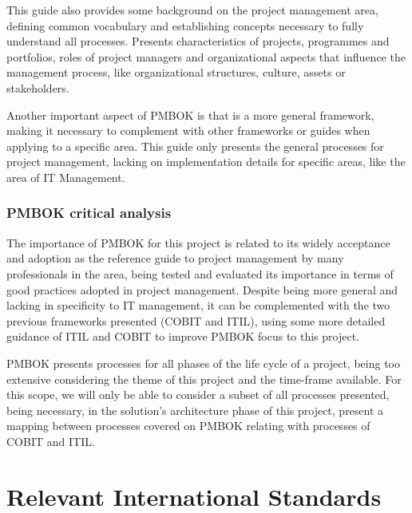 This guide also provides some background on the project management area, defining common vocabulary and establishing concepts necessary to fully understand all processes. Presents characteristics of projects, programmes and portfolios, roles of project managers and organizational aspects that influence the management process, like organizational structures, culture, assets or stakeholders.\par 
Another important aspect of PMBOK is that is a more general framework, making it necessary to complement with other frameworks or guides when applying to a specific area. This guide only presents the general processes for project management, lacking on implementation details for specific areas, like the area of IT Management.\par 

\subsubsection{PMBOK critical analysis}

The importance of PMBOK for this project is related to its widely acceptance and adoption as the reference guide to project management by many professionals in the area, being tested and evaluated its importance in terms of good practices adopted in project management. Despite being more general and lacking in specificity to IT management, it can be complemented with the two previous frameworks presented (COBIT and ITIL), using some more detailed guidance of ITIL and COBIT to improve PMBOK focus to this project.\par
PMBOK presents processes for all phases of the life cycle of a project, being too extensive considering the theme of this project and the time-frame available. For this scope, we will only be able to consider a subset of all processes presented, being necessary, in the solution's architecture phase of this project, present a mapping between processes covered on PMBOK relating with processes of COBIT and ITIL.


\section{Relevant International Standards}

